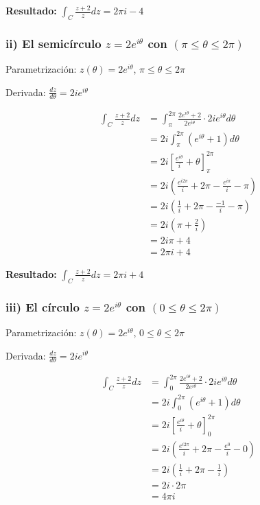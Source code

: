 \documentclass{article}
\begin{document}
\textbf{Resultado:} $\int_C \frac{z + 2}{z} dz = 2\pi i - 4$

\subsubsection*{ii) El semicírculo $z = 2e^{i\theta}$ con $(\pi \leq \theta \leq 2\pi)$}

Parametrización: $z(\theta) = 2e^{i\theta}$, $\pi \leq \theta \leq 2\pi$

Derivada: $\frac{dz}{d\theta} = 2ie^{i\theta}$

\begin{align*}
\int_C \frac{z + 2}{z} dz &= \int_{\pi}^{2\pi} \frac{2e^{i\theta} + 2}{2e^{i\theta}} \cdot 2ie^{i\theta} d\theta \\
                          &= 2i \int_{\pi}^{2\pi} (e^{i\theta} + 1) d\theta \\
                          &= 2i \left[\frac{e^{i\theta}}{i} + \theta\right]_{\pi}^{2\pi} \\
                          &= 2i \left(\frac{e^{i2\pi}}{i} + 2\pi - \frac{e^{i\pi}}{i} - \pi\right) \\
                          &= 2i \left(\frac{1}{i} + 2\pi - \frac{-1}{i} - \pi\right) \\
                          &= 2i \left(\pi + \frac{2}{i}\right) \\
                          &= 2i\pi + 4 \\
                          &= 2\pi i + 4
\end{align*}

\textbf{Resultado:} $\int_C \frac{z + 2}{z} dz = 2\pi i + 4$

\subsubsection*{iii) El círculo $z = 2e^{i\theta}$ con $(0 \leq \theta \leq 2\pi)$}

Parametrización: $z(\theta) = 2e^{i\theta}$, $0 \leq \theta \leq 2\pi$

Derivada: $\frac{dz}{d\theta} = 2ie^{i\theta}$

\begin{align*}
\int_C \frac{z + 2}{z} dz &= \int_0^{2\pi} \frac{2e^{i\theta} + 2}{2e^{i\theta}} \cdot 2ie^{i\theta} d\theta \\
                          &= 2i \int_0^{2\pi} (e^{i\theta} + 1) d\theta \\
                          &= 2i \left[\frac{e^{i\theta}}{i} + \theta\right]_0^{2\pi} \\
                          &= 2i \left(\frac{e^{i2\pi}}{i} + 2\pi - \frac{e^0}{i} - 0\right) \\
                          &= 2i \left(\frac{1}{i} + 2\pi - \frac{1}{i}\right) \\
                          &= 2i \cdot 2\pi \\
                          &= 4\pi i
\end{align*}
\end{document}
